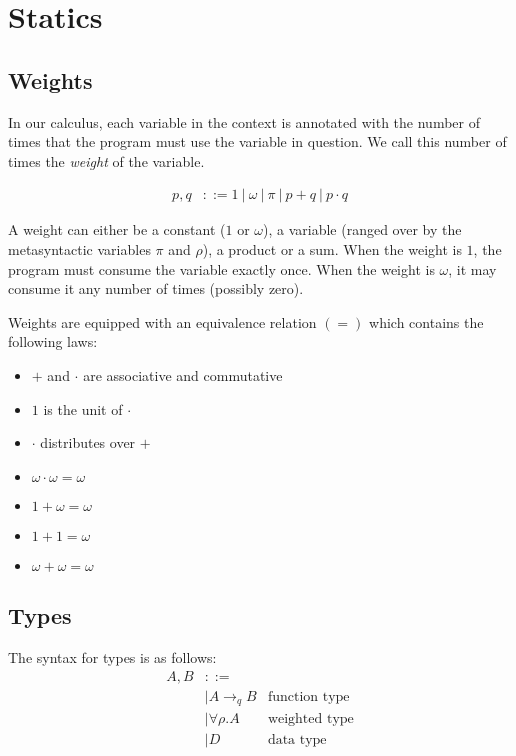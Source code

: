 \documentclass[11pt]{article}
\begin{document}


\section{Statics}
\label{sec:orgheadline8}
\subsection{Weights}
\label{sec:orgheadline1}

In our calculus, each variable in the context is annotated with the
number of times that the program must use the variable in question.
We call this number of times the \emph{weight} of the variable.

\begin{align*}
  p,q &::= 1 ~|~ ω ~|~ π ~|~ p+q ~|~ p·q
\end{align*}

A weight can either be a constant ($1$ or $ω$), a variable (ranged
over by the metasyntactic variables \(π\) and \(ρ\)), a product or a
sum.  When the weight is $1$, the program must consume the variable
exactly once. When the weight is $ω$, it may consume it any number of
times (possibly zero).

Weights are equipped with an equivalence relation $(=)$ which contains
the following laws:

\begin{itemize}
\item $+$ and $·$ are associative and commutative
\item $1$ is the unit of $·$
\item $·$ distributes over $+$
\item $ω · ω = ω$
\item $1 + ω = ω$
\item $1 + 1 = ω$
\item $ω + ω = ω$
\end{itemize}

\subsection{Types}
\label{sec:orgheadline2}

The syntax for types is as follows:
\begin{align*}
  A,B &::=\\
      & |  A →_q B &\text{function type}\\
      & |  ∀ρ. A &\text{weighted type}\\
      & |  D &\text{data type}
\end{align*}
\end{document}
